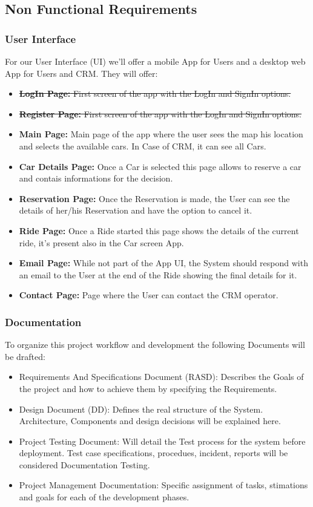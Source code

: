 \documentclass[a4paper]{article}
\begin{document}
\subsection{Non Functional Requirements}
\subsubsection{User Interface}
For our User Interface (UI) we'll offer a mobile App for Users and a desktop web App for Users and CRM. They will offer:
\begin {itemize}
\item \sout{\textbf{LogIn Page:} First screen of the app with the LogIn and SignIn options.}
\item \sout{\textbf{Register Page:} First screen of the app with the LogIn and SignIn options.}
\item \textbf{Main Page:} Main page of the app where the user sees the map his location and selects the available cars. In Case of CRM, it can see all Cars.
\item \textbf{Car Details Page:} Once a Car is selected this page allows to reserve a car and contais informations for the decision.
\item \textbf{Reservation Page:} Once the Reservation is made, the User can see the details of her/his Reservation and have the option to cancel it.
\item \textbf{Ride Page:} Once a Ride started this page shows the details of the current ride, it's present also in the Car screen App.
\item \textbf{Email Page:} While not part of the App UI, the System should respond with an email to the User at the end of the Ride showing the final details for it.
\item \textbf{Contact Page:} Page where the User can contact the CRM operator.
\end{itemize}
\subsubsection{Documentation}
To organize this project workflow and development the following Documents will be drafted:
\begin {itemize}
\item Requirements And Specifications Document (RASD): Describes the Goals of the project and how to achieve them by specifying the Requirements.
\item Design Document (DD): Defines the real structure of the System. Architecture, Components and design decisions will be explained here.
\item Project Testing Document: Will detail the Test process for the system before deployment. Test case specifications, procedues, incident, reports will be considered Documentation Testing.
\item Project Management Documentation: Specific assignment of tasks, stimations and goals for each of the development phases.
\end{itemize}
\end{document}
